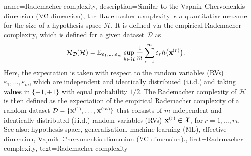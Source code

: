 {
{name={Rademacher complexity},
 	description={Similar to the Vapnik–Chervonenkis dimension (VC dimension), the  Rademacher 
	complexity \cite{bartlett2002rademacher} is a quantitative measure 
	for the size of a hypothesis space $\mathcal{H}$. It is defined via the 
	empirical Rademacher complexity, which is defined for a given dataset 
	$\mathcal{D}$ as
	\begin{equation}
    \mathcal{R}_\mathcal{D}(\mathcal{H}) 
    = 
    \mathbb{E} _{\varepsilon_{1},\ldots,\varepsilon_{m} } 
	\sup_{h \in \mathcal{H}} \frac{1}{m} \sum_{r=1}^m \varepsilon_r 
	h\big({\bf x}^{(r)} \big).
    \label{eq:def_emprical_rademacher_complexity_hypothesis_dict}
    \end{equation}
	Here, the expectation is taken with respect to 
	the random variables (RVs) $\varepsilon_{1},\ldots,\varepsilon_{m}$,
	which are independent and identically distributed (i.i.d.) and taking values in $\{ -1, +1 \}$ with equal 
	probability $1/2$. The Rademacher complexity of $\mathcal{H}$ is 
	then defined as the expectation of the empirical Rademacher complexity 
	of a random dataset $\mathcal{D} = \{{\bf x}^{(1)}, \hdots, {\bf x}^{(m)}\}$
	that consists of $m$ independent and identically distributed (i.i.d.) random variables (RVs) ${\bf x}^{(r)} \in \mathcal{X}$, 
	for $r=1,\ldots,m$.  
        See also: hypothesis space,  generalization, machine learning (ML), effective dimension, Vapnik–Chervonenkis dimension (VC dimension).},
	first={Rademacher complexity},
	text={Rademacher complexity}  
}

}
